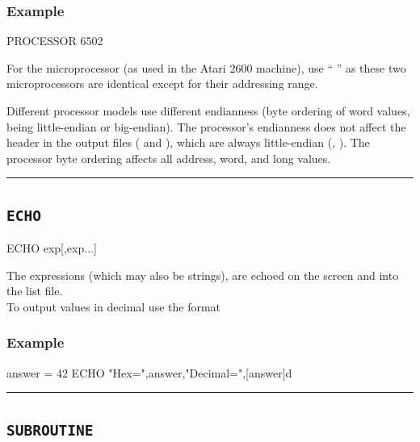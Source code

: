 \subsubsection{Example}
\begin{code}
  PROCESSOR 6502
\end{code}	

For the  microprocessor (as used in the Atari 2600 machine), use `` '' as these two microprocessors are identical except for their addressing range.
	
Different processor models use different endianness (byte ordering of word values, being little-endian or big-endian). The processor's endianness does not affect the header in the output files ( and ), which are always little-endian (, ). The processor byte ordering affects all address, word, and long values.\\

\hrule

\subsection{\texttt{ECHO}}
\label{pseudoop:echo}

\begin{usage}
  ECHO exp[,exp...]
\end{usage}

The expressions (which may also be strings), are echoed on the
screen and into the list file.\\

To output values in decimal use the format 

\subsubsection{Example}

\begin{code}
answer = 42
  ECHO "Hex=",answer,"Decimal=",[answer]d
\end{code}


\hrule

\subsection{\texttt{SUBROUTINE}}
\label{pseudoop:subroutine}

